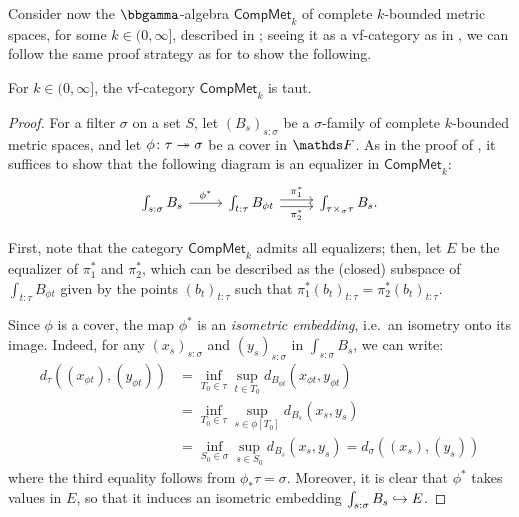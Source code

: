 Consider now the $\bbgamma$-algebra $\mathsf{CompMet}_k$ of complete $k$-bounded metric spaces, for some $k \in (0,\infty]$, described in ; seeing it as a vf-category as in , we can follow the same proof strategy as for  to show the following.

\begin{prop}\label{lem:compmetk-is-taut}
    For $k \in (0,\infty]$, the vf-category $\mathsf{CompMet}_k$ is taut.
\end{prop}
\begin{proof}
    For a filter $\sigma$ on a set $S$, let $(B_s)_{s:\sigma}$ be a $\sigma$-family of complete $k$-bounded metric spaces, and let $\phi \colon \tau \twoheadrightarrow \sigma$ be a cover in $\FF$. As in the proof of , it suffices to show that the following diagram is an equalizer in $\mathsf{CompMet}_k$:
    \[\begin{tikzcd}
        {\int_{s:\sigma} B_s} & {\int_{t:\tau} B_{\phi t}} & {\int_{\tau\times_\sigma\tau} B_s.}
        \arrow["{\phi^*}", from=1-1, to=1-2]
        \arrow["{\pi_1^*}", shift left, from=1-2, to=1-3]
        \arrow["{\pi_2^*}"', shift right, from=1-2, to=1-3]
    \end{tikzcd}\]

    First, note that the category $\mathsf{CompMet}_k$ admits all equalizers; then, let $E$ be the equalizer of $\pi_1^*$ and $\pi_2^*$, which can be described as the (closed) subspace of $\int_{t:\tau}B_{\phi t}$ given by the points $(b_t)_{t:\tau}$ such that $\pi_1^* (b_t)_{t:\tau} = \pi_2^*(b_t)_{t:\tau}$.

    Since $\phi$ is a cover, the map $\phi^*$ is an \emph{isometric embedding}, i.e.\ an isometry onto its image. Indeed, for any $(x_s)_{s:\sigma}$ and $(y_s)_{s:\sigma}$ in $\int_{s:\sigma}B_s$, we can write:
    \begin{align*}
     d_\tau((x_{\phi t}),(y_{\phi t})) & = \inf_{T_0\in\tau}\sup_{t\in T_0}d_{B_{\phi t}}(x_{\phi t},y_{\phi t})\\ & = \inf_{T_0\in\tau}\sup_{s\in\phi[T_0]}d_{B_s}(x_s,y_s)\\ & = \inf_{S_0\in\sigma}\sup_{s\in S_0}d_{B_s}(x_s,y_s) = d_\sigma((x_s),(y_s))
    \end{align*}
    where the third equality follows from $\phi_*\tau = \sigma$.
    Moreover, it is clear that $\phi^*$ takes values in $E$, so that it induces an isometric embedding $\int_{s:\sigma}B_s\hookrightarrow E$.
    

\end{proof}
